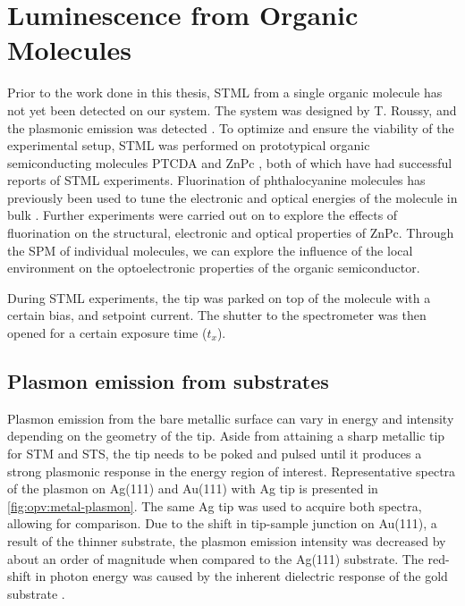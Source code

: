 
\chapter{Luminescence from Organic Molecules}
\label{ch:opv}

Prior to the work done in this thesis, \ac{STML} from a single organic molecule has not yet been detected on our system. The system was designed by T. Roussy, and the plasmonic emission was detected \citep{roussy2016coupling}. To optimize and ensure the viability of the experimental setup, \ac{STML} was performed on prototypical organic semiconducting molecules \ac{PTCDA} \citep{Rzeznicka2011, Kimura2019} and \ac{ZnPc} \citep{Zhang2016, Doppagne2017, Zhang2017, Imada2016, Doppagne2018, Miwa2019}, both of which have had successful reports of \ac{STML} experiments. Fluorination of phthalocyanine molecules has previously been used to tune the electronic and optical energies of the molecule in bulk \citep{schwarze2016band, warren2019controlling}. Further experiments were carried out on  to explore the effects of fluorination on the structural, electronic and optical properties of ZnPc. Through the \ac{SPM} of individual molecules, we can explore the influence of the local environment on the optoelectronic properties of the organic semiconductor.

During \ac{STML} experiments, the tip was parked on top of the molecule with a certain bias, and setpoint current. The shutter to the spectrometer was then opened for a certain exposure time ($t_x$).

\section{Plasmon emission from substrates}

Plasmon emission from the bare metallic surface can vary in energy and intensity depending on the geometry of the tip. Aside from attaining a sharp metallic tip for \ac{STM} and \ac{STS}, the tip needs to be poked and pulsed until it produces a strong plasmonic response in the energy region of interest. Representative spectra of the plasmon on Ag(111) and Au(111) with Ag tip is presented in \autoref{fig:opv:metal-plasmon}. The same Ag tip was used to acquire both spectra, allowing for comparison. Due to the shift in tip-sample junction on Au(111), a result of the thinner substrate, the plasmon emission intensity was decreased by about an order of magnitude when compared to the Ag(111) substrate. The red-shift in photon energy was caused by the inherent dielectric response of the gold substrate \citep{olmon2012optical, yang2015optical}. 

